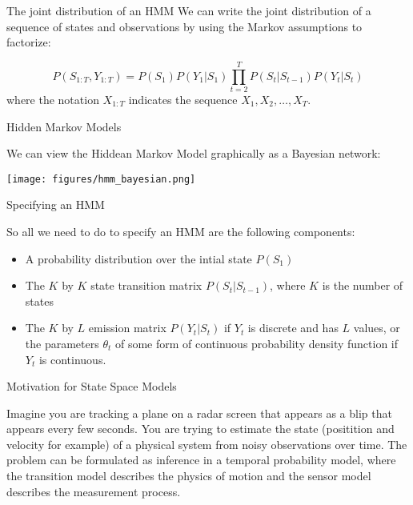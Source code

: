 \documentclass[12pt]{beamer}
\begin{document}
\begin{frame}{The joint distribution of an HMM}
We can write the joint distribution of a sequence of states and observations by using the Markov assumptions to factorize: 
  
  \[
  P(S_{1:T}, Y_{1:T}) = P(S_1) P(Y_1| S_1) \prod_{t=2}^{T} P(S_t|S_{t-1}) P(Y_{t}|S_t)
  \]
\noindent where the notation $X_{1:T}$ indicates the sequence $X_1, X_2, \dots, X_T$. 
\end{frame} 

\begin{frame}{Hidden Markov Models}

  We can view the Hiddean Markov Model graphically as a Bayesian network:
  
  
  \begin{center}
    \texttt{[image: figures/hmm\_bayesian.png]}
    \end{center}
\end{frame} 

\begin{frame}{Specifying an HMM}

  So all we need to do to specify an HMM are the following components:
  \begin{itemize}
  \item A probability distribution over the intial state $P(S_1)$
    \item The $K$ by $K$ state transition matrix $P(S_t|S_{t-1})$,
      where $K$ is the number of states
      \item The $K$ by $L$ emission matrix $P(Y_t | S_t)$ if $Y_t$ is
        discrete and has $L$ values, or the parameters $\theta_t$ of
        some form of continuous probability density function if $Y_t$
        is continuous.
    \end{itemize} 
  

  \end{frame} 

\begin{frame}{Motivation for State Space Models}

  Imagine you are tracking a plane on a radar screen that appears as a
  blip that appears every few seconds. You are trying to estimate the
  state (positition and velocity for example) of a physical system
  from noisy observations over time. The problem can be formulated as
  inference in a temporal probability model, where the transition
  model describes the physics of motion and the sensor model describes
  the measurement process.
 
\end{frame}
\end{document}
